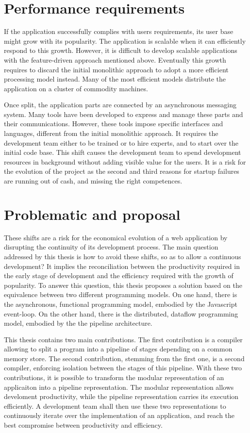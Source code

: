 \section{Performance requirements}

If the application successfully complies with users requirements, its user base might grow with its popularity.
The application is scalable when it can efficiently respond to this growth.
However, it is difficult to develop scalable applications with the feature-driven approach mentioned above.
Eventually this growth requires to discard the initial monolithic approach to adopt a more efficient processing model instead.
Many of the most efficient models distribute the application on a cluster of commodity machines.

Once split, the application parts are connected by an asynchronous messaging system.
Many tools have been developed to express and manage these parts and their communications.
However, these tools impose specific interfaces and languages, different from the initial monolithic approach.
It requires the development team either to be trained or to hire experts, and to start over the initial code base.
This shift causes the development team to spend development resources in background without adding visible value for the users.
It is a risk for the evolution of the project as the second and third reasons for startup failures are running out of cash, and missing the right competences.

\section{Problematic and proposal}

These shifts are a risk for the economical evolution of a web application by disrupting the continuity of its development process.
The main question addressed by this thesis is how to avoid these shifts, so as to allow a continuous development?
It implies the reconciliation between the productivity required in the early stage of development and the efficiency required with the growth of popularity.
To answer this question, this thesis proposes a solution based on the equivalence between two different programming models.
On one hand, there is the asynchronous, functional programming model, embodied by the Javascript event-loop.
On the other hand, there is the distributed, dataflow programming model, embodied by the the pipeline architecture.

This thesis contains two main contributions.
The first contribution is a compiler allowing to split a program into a pipeline of stages depending on a common memory store.
The second contribution, stemming from the first one, is a second compiler, enforcing isolation between the stages of this pipeline.
With these two contributions, it is possible to transform the modular representation of an applicaiton into a pipeline representation.
The modular representation allows develoment productivity, while the pipeline representation carries its execution efficiently.
A development team shall then use these two representations to continuously iterate over the implementation of an application, and reach the best compromise between productivity and efficiency.

